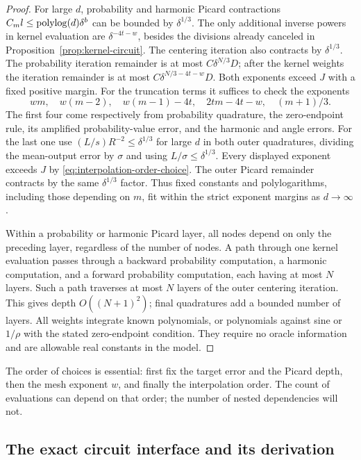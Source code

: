 \begin{proof}
For large $d$, probability and harmonic Picard contractions
$C_ml\le\operatorname{polylog}(d)\delta^b$ can be bounded by $\delta^{1/3}$.
The only additional inverse powers in kernel evaluation are
$\delta^{-4t-w}$, besides the divisions already canceled in
Proposition~\ref{prop:kernel-circuit}.  The centering iteration also
contracts by $\delta^{1/3}$.  The probability iteration remainder is
at most $C\delta^{N/3}D$; after the kernel weights the iteration
remainder is at most $C\delta^{N/3-4t-w}D$.  Both exponents exceed
$J$ with a fixed positive margin.  For the truncation terms it suffices
to check the exponents
\[
 wm,\quad w(m-2),\quad w(m-1)-4t,\quad
 2tm-4t-w,\quad (m+1)/3.
\]
The first four come respectively from probability quadrature, the
zero-endpoint rule, its amplified probability-value error, and the
harmonic and angle errors.  For the last one use
$(L/s)R^{-2}\le\delta^{1/3}$ for large $d$ in both outer
quadratures, dividing the mean-output error by $\sigma$ and using
$L/\sigma\le\delta^{1/3}$.
Every displayed exponent exceeds $J$ by
\eqref{eq:interpolation-order-choice}.  The outer Picard remainder
contracts by the same $\delta^{1/3}$ factor.  Thus fixed constants
and polylogarithms, including those depending on $m$, fit within the
strict exponent margins as $d\to\infty$.

Within a probability or harmonic Picard layer, all nodes depend on
only the preceding layer, regardless of the number of nodes.  A path
through one kernel evaluation passes through a backward probability
computation, a harmonic computation, and a forward probability
computation, each having at most $N$ layers.  Such a path traverses at
most $N$ layers of the outer centering iteration.  This gives depth
$O((N+1)^2)$; final quadratures add a bounded number of layers.
All weights integrate known polynomials, or polynomials against sine
or $1/\rho$ with the stated zero-endpoint condition.  They require no
oracle information and are allowable real constants in the model.
\end{proof}

The order of choices is essential: first fix the target error and the
Picard depth, then the mesh exponent $w$, and finally the interpolation
order.  The count of evaluations can depend on that order; the number
of nested dependencies will not.

\subsection{The exact circuit interface and its derivation}

